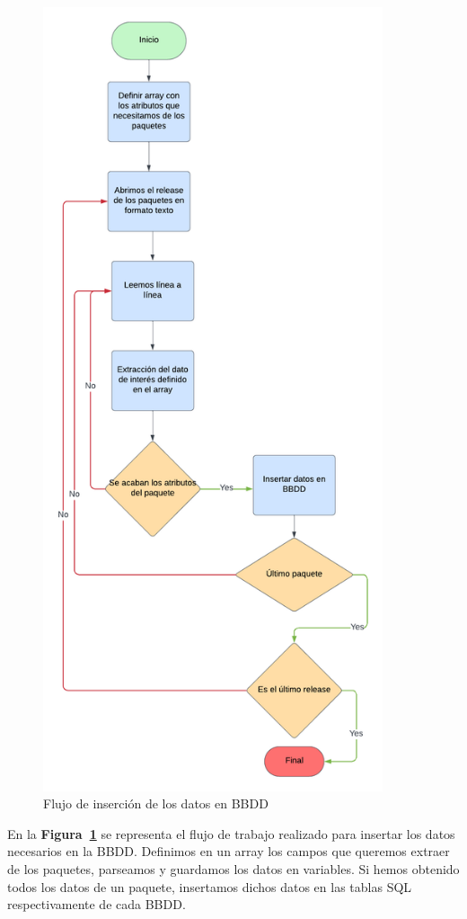 \documentclass[a4paper, 12pt]{book}
\begin{document}
\begin{figure}
	\centering
	\includegraphics[width=10cm, keepaspectratio]{img/Insertar BBDD.png}
	\caption{Flujo de inserción de los datos en BBDD}
	\label{fig:flujo insertar datos}
\end{figure}
En la \textbf{Figura~\ref{fig:flujo insertar datos}} se representa el flujo de trabajo realizado para insertar los datos necesarios en la BBDD. Definimos en un array los campos que queremos extraer de los paquetes, parseamos y guardamos los datos en variables. Si hemos obtenido todos los datos de un paquete, insertamos dichos datos en las tablas SQL respectivamente de cada BBDD. 
\end{document}
